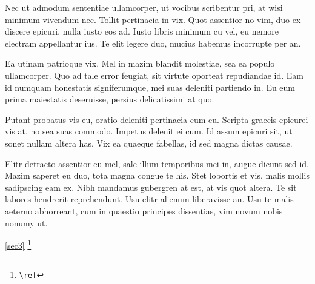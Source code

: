 \documentclass[twoside, 10pt]{article}
\begin{document}
    Nec ut admodum sententiae ullamcorper, ut vocibus scribentur pri, at wisi minimum vivendum nec. Tollit pertinacia in vix. 
    Quot assentior no vim, duo ex discere epicuri, nulla iusto eos ad. Iusto libris minimum cu vel, eu nemore electram appellantur ius. 
    Te elit legere duo, mucius habemus incorrupte per an.

    Ea utinam patrioque vix. Mel in mazim blandit molestiae, sea ea populo ullamcorper. Quo ad tale error feugiat, 
    sit virtute oporteat repudiandae id. Eam id numquam honestatis signiferumque, mei suas deleniti partiendo in. 
    Eu eum prima maiestatis deseruisse, persius delicatissimi at quo.

    Putant probatus vis eu, oratio deleniti pertinacia eum eu. Scripta graecis epicurei vis at, no sea suas commodo. 
    Impetus delenit ei cum. Id assum epicuri sit, ut sonet nullam altera has. Vix ea quaeque fabellas, id sed magna dictas causae.

    Elitr detracto assentior eu mel, sale illum temporibus mei in, augue dicunt sed id. Mazim saperet eu duo, 
    tota magna congue te his. Stet lobortis et vis, malis mollis sadipscing eam ex. Nibh mandamus gubergren at est, 
    at vis quot altera. Te sit labores hendrerit reprehendunt. Usu elitr alienum liberavisse an. Usu te malis aeterno 
    abhorreant, cum in quaestio principes dissentias, vim novum nobis nonumy ut.
    
    \ref{sec3}
    \footnote{\texttt{\textbackslash ref}}
\end{document}
